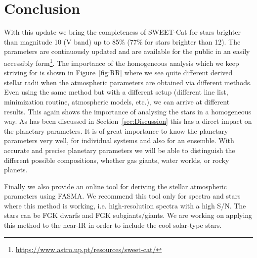 \documentclass{aa}
\begin{document}
\section{Conclusion}
\label{sec:conclusion}

With this update we bring the completeness of SWEET-Cat for stars brighter than
magnitude 10 (V band) up to 85\% (77\% for stars brighter than 12). The
parameters are continuously updated and are available for the public in an
easily accessibly
form\footnote{\url{https://www.astro.up.pt/resources/sweet-cat/}}. The
importance of the homogeneous analysis which we keep striving for is shown in
Figure~\ref{fig:RR} where we see quite different derived stellar radii when the
atmospheric parameters are obtained via different methods. Even using the same
method but with a different setup (different line list, minimization routine,
atmospheric models, etc.), we can arrive at different results. This again shows
the importance of analysing the stars in a homogeneous way. As has been
discussed in Section~\ref{sec:Discussion} this has a direct impact on the
planetary parameters. It is of great importance to know the planetary parameters
very well, for individual systems and also for an ensemble. With accurate and
precise planetary parameters we will be able to distinguish the different
possible compositions, whether gas giants, water worlds, or rocky planets.

Finally we also provide an online tool for deriving the stellar atmospheric
parameters using FASMA. We recommend this tool only for spectra and stars where
this method is working, i.e. high-resolution spectra with a high S/N. The stars
can be FGK dwarfs and FGK subgiants/giants. We are working on applying this
method to the near-IR in order to include the cool solar-type stars.
\end{document}
